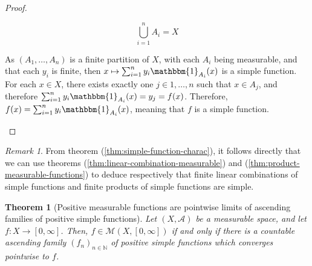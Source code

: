 \documentclass{article}
\newtheorem{theorem}{Theorem}[section]
\theoremstyle{definition}
\theoremstyle{remark}
\newtheorem*{remark}{Remark}
\theoremstyle{example}
\theoremstyle{notation}
\theoremstyle{axiom}
\begin{document}
\begin{proof}
\begin{itemize}
\begin{itemize}
								$$\bigcup_{i=1}^n A_i = X$$
				\end{itemize}
				As $(A_1, \dots, A_n)$ is a finite partition of $X$, with each $A_i$ being measurable, and that each $y_i$ is finite, then $x \mapsto \sum_{i=1}^n y_i \mathbbm{1}_{A_i}(x)$ is a simple function. For each $x \in X$, there exists exactly one $j \in 1, \dots, n$ such that $x \in A_j$, and therefore $\sum_{i=1}^n y_i \mathbbm{1}_{A_i}(x) = y_j = f(x)$. Therefore, $f(x) = \sum_{i=1}^n y_i \mathbbm{1}_{A_i}(x)$, meaning that $f$ is a simple function.
		\end{itemize}
\end{proof}

\begin{remark}
		From theorem (\ref{thm:simple-function-charac}), it follows directly that we can use theorems (\ref{thm:linear-combination-measurable}) and (\ref{thm:product-measurable-functions}) to deduce respectively that finite linear combinations of simple functions and finite products of simple functions are simple.
\end{remark}

\begin{theorem}[Positive measurable functions are pointwise limits of ascending families of positive simple functions] \label{thm:pointwise-simple} %
		Let $(X, \mathcal{A})$ be a measurable space, and let $f : X \rightarrow [0, \infty]$. Then, $f \in \mathcal{M}(X, [0, \infty])$ if and only if there is a countable ascending family $(f_n)_{n \in \mathbb{N}}$ of positive simple functions which converges pointwise to $f$.
\end{theorem}
\end{document}
